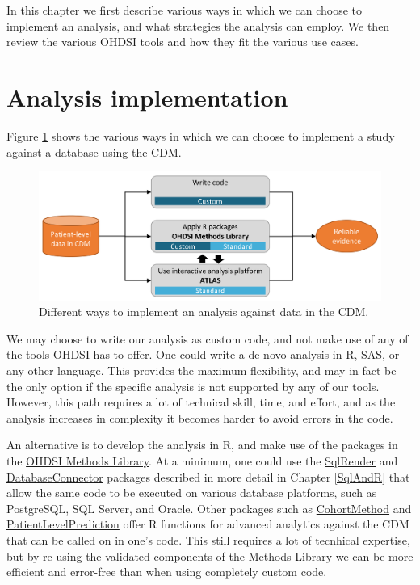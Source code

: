 \documentclass[11pt]{book}
\theoremstyle{definition}
\theoremstyle{definition}
\theoremstyle{definition}
\theoremstyle{remark}
\begin{document}
In this chapter we first describe various ways in which we can choose to implement an analysis, and what strategies the analysis can employ. We then review the various OHDSI tools and how they fit the various use cases.

\hypertarget{analysisImplementation}{%
\section{Analysis implementation}\label{analysisImplementation}}

Figure \ref{fig:implementations} shows the various ways in which we can choose to implement a study against a database using the CDM.

\begin{figure}

{\centering \includegraphics[width=0.9\linewidth]{images/OhdsiAnalyticsTools/implementations} 

}

\caption{Different ways to implement an analysis against data in the CDM.}\label{fig:implementations}
\end{figure}

We may choose to write our analysis as custom code, and not make use of any of the tools OHDSI has to offer. One could write a de novo analysis in R, SAS, or any other language. This provides the maximum flexibility, and may in fact be the only option if the specific analysis is not supported by any of our tools. However, this path requires a lot of technical skill, time, and effort, and as the analysis increases in complexity it becomes harder to avoid errors in the code.

An alternative is to develop the analysis in R, and make use of the packages in the \href{https://ohdsi.github.io/MethodsLibrary/}{OHDSI Methods Library}. At a minimum, one could use the \href{https://ohdsi.github.io/SqlRender/}{SqlRender} and \href{https://ohdsi.github.io/DatabaseConnector/}{DatabaseConnector} packages described in more detail in Chapter \ref{SqlAndR} that allow the same code to be executed on various database platforms, such as PostgreSQL, SQL Server, and Oracle. Other packages such as \href{https://ohdsi.github.io/CohortMethod/}{CohortMethod} and \href{https://ohdsi.github.io/PatientLevelPrediction/}{PatientLevelPrediction} offer R functions for advanced analytics against the CDM that can be called on in one's code. This still requires a lot of tecnhical expertise, but by re-using the validated components of the Methods Library we can be more efficient and error-free than when using completely custom code.
\end{document}
